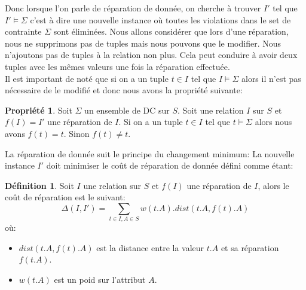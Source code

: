 \documentclass[letterpaper, 12pt]{report}
\theoremstyle{definition}
\newtheorem{mydef}{Définition}
\newtheorem{myprop}{Propriété}
\begin{document}
Donc lorsque l'on parle de réparation de donnée, on cherche à trouver $I'$ tel que $I' \models \Sigma$ c'est à dire une nouvelle instance où toutes les violations dans le set de contrainte $\Sigma$ sont éliminées. Nous allons considérer que lors d'une réparation, nous ne supprimons pas de tuples mais nous pouvons que le modifier. Nous n'ajoutons pas de tuples à la relation non plus. Cela peut conduire à avoir deux tuples avec les mêmes valeurs une fois la réparation effectuée.\\

Il est important de noté que si on a un tuple $t \in I$ tel que $I \models \Sigma$ alors il n'est pas nécessaire de le modifié et donc nous avons la propriété suivante:

\begin{myprop}
	Soit $\Sigma$ un ensemble de DC sur $S$. Soit une relation $I$ sur $S$ et $f(I) = I'$ une réparation de $I$. Si on a un tuple $t \in I$ tel que $t \models \Sigma$ alors nous avons $f(t) = t$. Sinon $f(t) \neq t$.
\end{myprop}




La réparation de donnée suit le principe du changement minimum: La nouvelle instance $I'$ doit minimiser le coût de réparation de donnée défini comme étant:

\begin{mydef}
 Soit $I$ une relation sur $S$ et $f(I)$ une réparation de $I$, alors le coût de réparation est le suivant:
 $$ \Delta(I,I') = \sum_{t \in I, A \in S} w(t.A).dist(t.A,f(t).A) $$
 où:
 \begin{itemize}
 	\item $dist(t.A,f(t).A)$ est la distance entre la valeur $t.A$ et sa réparation $f(t.A)$.
 	\item $w(t.A)$ est un poid sur l'attribut $A$.
 \end{itemize}
\end{mydef}
\end{document}
